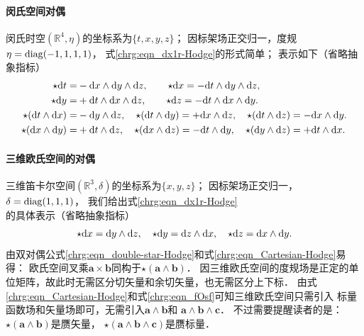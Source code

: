 \paragraph{闵氏空间对偶} %
闵氏时空$(\mathbb{R}^4,\eta)$的坐标系为$\{t,x,y,z\}$；
因标架场正交归一，度规$\eta={\rm diag}(-1,1,1,1)$，
式\eqref{chrg:eqn_dx1r-Hodge}的形式简单；
表示如下（省略抽象指标）
\begin{align*}
    \star  {\rm d}t =& -{\rm d}x \wedge {\rm d}y \wedge {\rm d}z , \qquad
    \star  {\rm d}x =  -{\rm d}t \wedge {\rm d}y \wedge {\rm d}z , \\
    \star  {\rm d}y =& +{\rm d}t \wedge {\rm d}x \wedge {\rm d}z , \qquad
    \star  {\rm d}z =  -{\rm d}t \wedge {\rm d}x \wedge {\rm d}y . \\
    \star  ({\rm d}t \wedge {\rm d}x) =&- {\rm d}y \wedge {\rm d}z, \quad
    \star  ({\rm d}t \wedge {\rm d}y) = + {\rm d}x \wedge {\rm d}z, \quad
    \star  ({\rm d}t \wedge {\rm d}z) = - {\rm d}x \wedge {\rm d}y. \\
    \star  ({\rm d}x \wedge {\rm d}y) =&+ {\rm d}t \wedge {\rm d}z, \quad
    \star  ({\rm d}x \wedge {\rm d}z) = - {\rm d}t \wedge {\rm d}y, \quad
    \star  ({\rm d}y \wedge {\rm d}z) = + {\rm d}t \wedge {\rm d}x.
\end{align*}


\paragraph{三维欧氏空间的对偶}
三维笛卡尔空间$(\mathbb{R}^3,\delta)$的坐标系为$\{x,y,z\}$；
因标架场正交归一，$\delta={\rm diag}(1,1,1)$，
我们给出式\eqref{chrg:eqn_dx1r-Hodge}的具体表示（省略抽象指标）
\begin{equation}\label{chrg:eqn_Cartesian-Hodge}
    \star  {\rm d}x = {\rm d}y \wedge {\rm d}z, \quad
    \star  {\rm d}y = {\rm d}z \wedge {\rm d}x, \quad
    \star  {\rm d}z = {\rm d}x \wedge {\rm d}y.
\end{equation}
由双对偶公式\eqref{chrg:eqn_double-star-Hodge}和式\eqref{chrg:eqn_Cartesian-Hodge}易得：
欧氏空间叉乘$\boldsymbol{a}\times \boldsymbol{b}$同构于$\star (\boldsymbol{a}\wedge \boldsymbol{b})$．
因三维欧氏空间的度规场是正定的单位矩阵，故此时无需区分切矢量和余切矢量，也无需区分上下标．
由式\eqref{chrg:eqn_Cartesian-Hodge}和式\eqref{chrg:eqn_fOsf}可知三维欧氏空间只需引入
标量函数场和矢量场即可，无需引入$\boldsymbol{a}\wedge \boldsymbol{b}$和
$\boldsymbol{a}\wedge \boldsymbol{b}\wedge \boldsymbol{c}$．
不过需要提醒读者的是：$\star (\boldsymbol{a}\wedge \boldsymbol{b})$是赝矢量，
$\star (\boldsymbol{a}\wedge \boldsymbol{b}\wedge \boldsymbol{c})$是赝标量．

